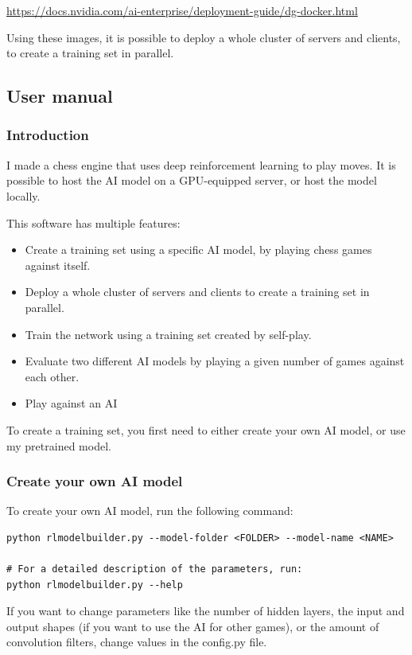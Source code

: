 \documentclass{article}
\begin{document}
\url{https://docs.nvidia.com/ai-enterprise/deployment-guide/dg-docker.html}

Using these images, it is possible to deploy a whole cluster of servers and clients,
to create a training set in parallel.


\newpage
\subsection{User manual}

\subsubsection{Introduction}

I made a chess engine that uses deep reinforcement learning to 
play moves. It is possible to host the AI model on a GPU-equipped server, or
host the model locally.

This software has multiple features:

\begin{itemize}
	\item Create a training set using a specific AI model, by playing chess games against itself.
	\item Deploy a whole cluster of servers and clients to create a training set in parallel.
	\item Train the network using a training set created by self-play.
	\item Evaluate two different AI models by playing a given number of games against each other.
	\item Play against an AI
\end{itemize}


To create a training set, you first need to either create your own AI model, or use my pretrained model.

\subsubsection{Create your own AI model}

To create your own AI model, run the following command:

\begin{verbatim}
python rlmodelbuilder.py --model-folder <FOLDER> --model-name <NAME> 

# For a detailed description of the parameters, run:
python rlmodelbuilder.py --help
\end{verbatim}

If you want to change parameters like the number of hidden layers, 
the input and output shapes (if you want to use the AI for other games), or the amount of convolution filters, 
change values in the config.py file.
\end{document}
